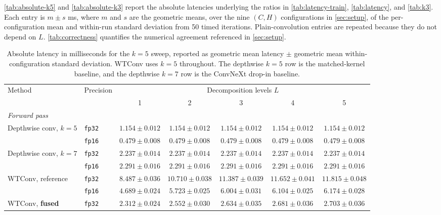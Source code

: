 \documentclass[10pt]{article} %
\theoremstyle{plain}
\begin{document}
\autoref{tab:absolute-k5} and \autoref{tab:absolute-k3} report the absolute
latencies underlying the ratios in \autoref{tab:latency-train},
\autoref{tab:latency}, and \autoref{tab:k3}. Each entry is $m\pm s$ ms, where
$m$ and $s$ are the geometric means, over the nine $(C,H)$ configurations in
\autoref{sec:setup}, of the per-configuration mean and within-run standard
deviation from 50 timed iterations. Plain-convolution entries are repeated
because they do not depend on $L$. \autoref{tab:correctness} quantifies the numerical agreement referenced in
\autoref{sec:setup}.

\begin{table}[htpb]
\centering
\scriptsize
\setlength{\tabcolsep}{1.5pt}
\caption{Absolute latency in milliseconds for the $k{=}5$ sweep, reported as
geometric mean latency $\pm$ geometric mean within-configuration standard
deviation. WTConv uses $k{=}5$ throughout. The depthwise $k{=}5$ row is the
matched-kernel baseline, and the depthwise $k{=}7$ row is the ConvNeXt drop-in
baseline.}
\label{tab:absolute-k5}
\begin{tabular}{llccccc}
\toprule
\multirow{2}{*}{Method} & \multirow{2}{*}{Precision} & \multicolumn{5}{c}{Decomposition levels $L$} \\
\cmidrule(lr){3-7}
 & & 1 & 2 & 3 & 4 & 5 \\
\midrule
\multicolumn{7}{l}{\textit{Forward pass}} \\
\addlinespace[2pt]
Depthwise conv, $k{=}5$ & \texttt{fp32} & $1.154\pm0.012$ & $1.154\pm0.012$ & $1.154\pm0.012$ & $1.154\pm0.012$ & $1.154\pm0.012$ \\
 & \texttt{fp16} & $0.479\pm0.008$ & $0.479\pm0.008$ & $0.479\pm0.008$ & $0.479\pm0.008$ & $0.479\pm0.008$ \\
\addlinespace[2pt]
Depthwise conv, $k{=}7$ & \texttt{fp32} & $2.237\pm0.014$ & $2.237\pm0.014$ & $2.237\pm0.014$ & $2.237\pm0.014$ & $2.237\pm0.014$ \\
 & \texttt{fp16} & $2.291\pm0.016$ & $2.291\pm0.016$ & $2.291\pm0.016$ & $2.291\pm0.016$ & $2.291\pm0.016$ \\
\addlinespace[2pt]
WTConv, reference & \texttt{fp32} & $8.487\pm0.036$ & $10.710\pm0.038$ & $11.387\pm0.039$ & $11.652\pm0.041$ & $11.815\pm0.048$ \\
 & \texttt{fp16} & $4.689\pm0.024$ & $5.723\pm0.025$ & $6.004\pm0.031$ & $6.104\pm0.025$ & $6.174\pm0.028$ \\
\addlinespace[2pt]
WTConv, \textbf{fused} & \texttt{fp32} & $2.312\pm0.024$ & $2.552\pm0.030$ & $2.634\pm0.035$ & $2.681\pm0.036$ & $2.703\pm0.036$ \\

\end{tabular}
\end{table}
\end{document}
